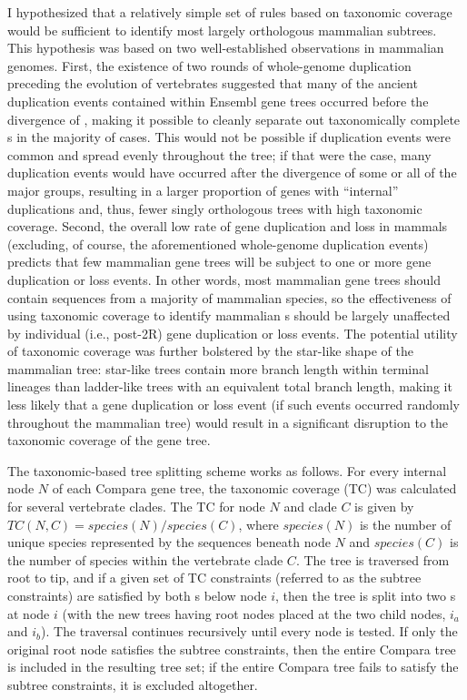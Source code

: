 I hypothesized that a relatively simple set of rules based on
taxonomic coverage would be sufficient to identify most largely
orthologous mammalian subtrees. This hypothesis was based on two
well-established observations in mammalian genomes. First, the
existence of two rounds of whole-genome duplication preceding the
evolution of vertebrates \citep{Dehal2005} suggested that many of the
ancient duplication events contained within Ensembl gene trees
occurred before the divergence of \mmls, making it possible to cleanly
separate out taxonomically complete \mmln \subtr{}s in the majority of
cases. This would not be possible if duplication events were common
and spread evenly throughout the \mmln tree; if that were the case,
many duplication events would have occurred after the divergence of
some or all of the major \mmln groups, resulting in a larger
proportion of \mmln genes with ``internal'' duplications and, thus,
fewer singly orthologous trees with high taxonomic coverage. Second,
the overall low rate of gene duplication and loss in mammals
\citep{Demuth2006} (excluding, of course, the
aforementioned whole-genome duplication events) predicts that few
mammalian gene trees will be subject to one or more gene duplication
or loss events. In other words, most mammalian gene trees should
contain sequences from a majority of mammalian species, so the
effectiveness of using taxonomic coverage to identify mammalian
\subtr{}s should be largely unaffected by individual (i.e., post-2R)
gene duplication or loss events. The potential utility of taxonomic
coverage was further bolstered by the star-like shape of the mammalian
tree: star-like trees contain more branch length within terminal
lineages than ladder-like trees with an equivalent total branch
length, making it less likely that a gene duplication or loss event
(if such events occurred randomly throughout the mammalian tree) would
result in a significant disruption to the taxonomic coverage of the
gene tree.

The taxonomic-based tree splitting scheme works as follows. For every
internal node $N$ of each Compara gene tree, the taxonomic coverage
(TC) was calculated for several vertebrate clades. The TC for node $N$
and clade $C$ is given by $TC(N,C) = species(N) / species(C) $, where
$species(N)$ is the number of unique species represented by the
sequences beneath node $N$ and $species(C)$ is the number of species
within the vertebrate clade $C$. The tree is traversed from root to
tip, and if a given set of TC constraints (referred to as the subtree
constraints) are satisfied by both \subtr{}s below node $i$, then the
tree is split into two \subtr{}s at node $i$ (with the new trees
having root nodes placed at the two child nodes, $i_a$ and $i_b$). The
traversal continues recursively until every node is tested. If only
the original root node satisfies the subtree constraints, then the
entire Compara tree is included in the resulting tree set; if the
entire Compara tree fails to satisfy the subtree constraints, it is
excluded altogether.

